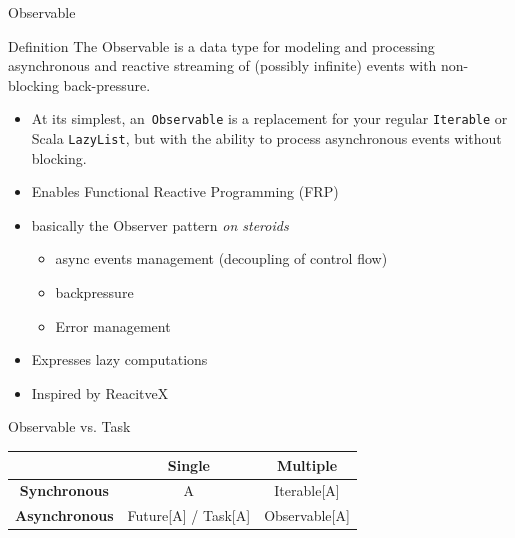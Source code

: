 \documentclass[presentation, 9pt]{beamer}\mode<presentation>{\usetheme{AMSBolognaFC}}
\begin{document}
\begin{frame}{Observable \href{https://monix.io/docs/current/reactive/observable.html}{\faLink}}
	\begin{alertblock}{Definition}
		The Observable is a data type for modeling and processing asynchronous and reactive streaming of (possibly infinite) events with non-blocking back-pressure.
	\end{alertblock}
	\begin{itemize}
		\item At its simplest, an\ \texttt{Observable} is a replacement for your regular \texttt{Iterable} or Scala \texttt{LazyList}, but with the ability to process asynchronous events without blocking.
  	\item Enables Functional Reactive Programming (FRP) 
   \item basically the Observer pattern \emph{on steroids}
   \begin{itemize}
			\item async events management (decoupling of control flow)
   		\item backpressure 
     	\item Error management
	 \end{itemize}
   \item Expresses lazy computations
   \item Inspired by ReacitveX \href{https://reactivex.io/intro.html}{\faLink}
	\end{itemize}
	\begin{alertblock}{Observable vs. Task}
		\begin{table}[]
			\centering
			\begin{tabular}{|c|c|c|}
			\hline
									 & \textbf{Single}                      & \textbf{Multiple}          \\ \hline
			\textbf{Synchronous}  & A                           & Iterable{[}A{]}   \\ \hline
			\textbf{Asynchronous} & Future{[}A{]} / Task{[}A{]} & Observable{[}A{]} \\ \hline
			\end{tabular}
			\end{table}
	\end{alertblock}
\end{frame}
\end{document}

